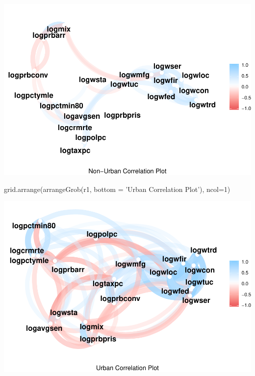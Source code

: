 \documentclass[]{article}
\newenvironment{Shaded}{}{}
\newcommand{\DataTypeTok}[1]{#1}
\newcommand{\DecValTok}[1]{#1}
\newcommand{\KeywordTok}[1]{\textcolor[rgb]{0.00,0.00,1.00}{#1}}
\newcommand{\NormalTok}[1]{#1}
\newcommand{\StringTok}[1]{\textcolor[rgb]{0.00,0.50,0.50}{#1}}
\begin{document}
\includegraphics{Bagnard_Gaustad_Hartman_Leung_Lab_3_files/figure-latex/unnamed-chunk-107-4.pdf}

\begin{Shaded}
\begin{Highlighting}[]
\KeywordTok{grid.arrange}\NormalTok{(}\KeywordTok{arrangeGrob}\NormalTok{(r1, }\DataTypeTok{bottom =} \StringTok{'Urban Correlation Plot'}\NormalTok{), }\DataTypeTok{ncol=}\DecValTok{1}\NormalTok{)}
\end{Highlighting}
\end{Shaded}

\includegraphics{Bagnard_Gaustad_Hartman_Leung_Lab_3_files/figure-latex/unnamed-chunk-107-5.pdf}
\end{document}
